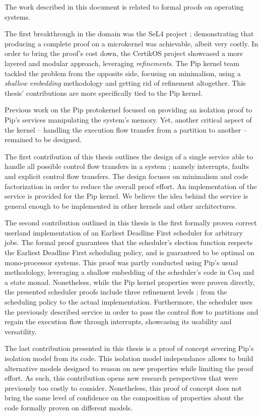 The work described in this document is related to formal proofs on operating systems.

The first breakthrough in the domain was the SeL4 project ; demonstrating that producing a complete proof on a microkernel was achievable, albeit very costly. 
In order to bring the proof's cost down, the CertikOS project showcased a more layered and modular approach, leveraging \emph{refinements}.
The Pip kernel team tackled the problem from the opposite side, focusing on minimalism, using a \emph{shallow embedding} methodology and getting rid of refinement altogether. This thesis' contributions are more specifically tied to the Pip kernel.

Previous work on the Pip protokernel focused on providing an isolation proof to Pip's services manipulating the system's memory. Yet, another critical aspect of the kernel -- handling the execution flow transfer from a partition to another -- remained to be designed.

The first contribution of this thesis outlines the design of a single service able to handle all possible control flow transfers in a system ; namely interrupts, faults and explicit control flow transfers. The design focuses on minimalism and code factorization in order to reduce the overall proof effort. An implementation of the service is provided for the Pip kernel. We believe the idea behind the service is general enough to be implemented in other kernels and other architectures.

The second contribution outlined in this thesis is the first formally proven correct userland implementation of an Earliest Deadline First scheduler for arbitrary jobs. The formal proof guarantees that the scheduler's election function respects the Earliest Deadline First scheduling policy, and is guaranteed to be optimal on mono-processor systems. This proof was partly conducted using Pip's usual methodology, leveraging a shallow embedding of the scheduler's code in Coq and a state monad. Nonetheless, while the Pip kernel properties were proven directly, the presented scheduler proofs include three refinement levels ; from the scheduling policy to the actual implementation. Furthermore, the scheduler uses the previously described service in order to pass the control flow to partitions and regain the execution flow through interrupts, showcasing its usability and versatility.

The last contribution presented in this thesis is a proof of concept severing Pip's isolation model from its code. This isolation model independance allows to build alternative models designed to reason on new properties while limiting the proof effort. As such, this contribution opens new research perspectives that were previously too costly to consider. Nonetheless, this proof of concept does not bring the same level of confidence on the composition of properties about the code formally proven on different models.
